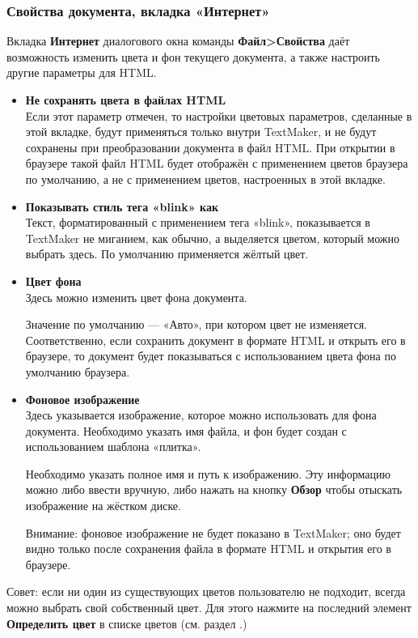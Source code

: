 ﻿\documentclass[a4paper,10pt]{article}
\begin{document}
 \subsubsection{Свойства документа, вкладка «Интернет»}
 Вкладка \textbf{Интернет} диалогового окна команды \textbf{Файл>Свойства} даёт возможность изменить цвета и фон текущего документа, а также настроить другие параметры для HTML.
 
 \begin{itemize}
  \item \textbf{Не сохранять цвета в файлах HTML}\\
  Если этот параметр отмечен, то настройки цветовых параметров, сделанные в этой вкладке, будут применяться только внутри TextMaker, и не будут сохранены при преобразовании документа в файл HTML. При открытии в браузере такой файл HTML будет отображён с применением цветов браузера по умолчанию, а не с применением цветов, настроенных в этой вкладке.
  \item \textbf{Показывать стиль тега «blink» как}\\
  Текст, форматированный с применением тега «blink», показывается в TextMaker не миганием, как обычно, а выделяется цветом, который можно выбрать здесь. По умолчанию применяется жёлтый цвет.
  \item \textbf{Цвет фона}\\
  Здесь можно изменить цвет фона документа.
  
  Значение по умолчанию — «Авто», при котором цвет не изменяется. Соответственно, если сохранить документ в формате HTML и открыть его в браузере, то документ будет показываться с использованием цвета фона по умолчанию браузера.
  \item \textbf{Фоновое изображение}\\
  Здесь указывается изображение, которое можно использовать для фона документа. Необходимо указать имя файла, и фон будет создан с использованием шаблона «плитка».
  
  Необходимо указать полное имя и путь к изображению. Эту информацию можно либо ввести вручную, либо нажать на кнопку \textbf{Обзор} чтобы отыскать изображение на жёстком диске.
  
  Внимание: фоновое изображение не будет показано в TextMaker; оно будет видно только после сохранения файла в формате HTML и открытия его в браузере.
 \end{itemize}

 Совет: если ни один из существующих цветов пользователю не подходит, всегда можно выбрать свой собственный цвет. Для этого нажмите на последний элемент \textbf{Определить цвет} в списке цветов (см. раздел .)
 
\end{document}
